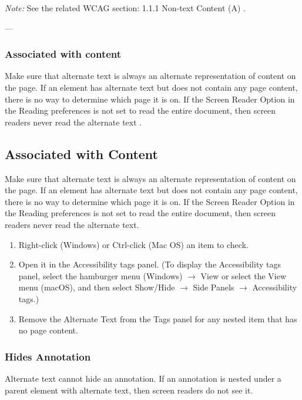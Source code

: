 \vspace{0.5em}
\noindent\textit{Note:} See the related WCAG section: 1.1.1 Non-text Content (A) \cite{WCAG}.

---

\subsubsection{Associated with content}
\label{subsubsec:acrobat-associated-content}
Make sure that alternate text is always an alternate representation of content on the page. If an element has alternate text but does not contain any page content, there is no way to determine which page it is on. If the Screen Reader Option in the Reading preferences is not set to read the entire document, then screen readers never read the alternate text \cite{AdobeHelpX}.

\vfill


\subsection{Associated with Content}
\label{subsec:acrobat-associated-content}
Make sure that alternate text is always an alternate representation of content on the page. If an element has alternate text but does not contain any page content, there is no way to determine which page it is on. If the Screen Reader Option in the Reading preferences is not set to read the entire document, then screen readers never read the alternate text.\ \cite{WCAG}

\begin{enumerate}
    \item Right-click (Windows) or Ctrl-click (Mac OS) an item to check.
    \item Open it in the Accessibility tags panel. (To display the Accessibility tags panel, select the hamburger menu (Windows) $\rightarrow$ View or select the View menu (macOS), and then select Show/Hide $\rightarrow$ Side Panels $\rightarrow$ Accessibility tags.)
    \item Remove the Alternate Text from the Tags panel for any nested item that has no page content.
\end{enumerate}

\subsubsection{Hides Annotation}
\label{subsubsec:acrobat-hides-annotation}
Alternate text cannot hide an annotation. If an annotation is nested under a parent element with alternate text, then screen readers do not see it.\ \cite{WCAG}

